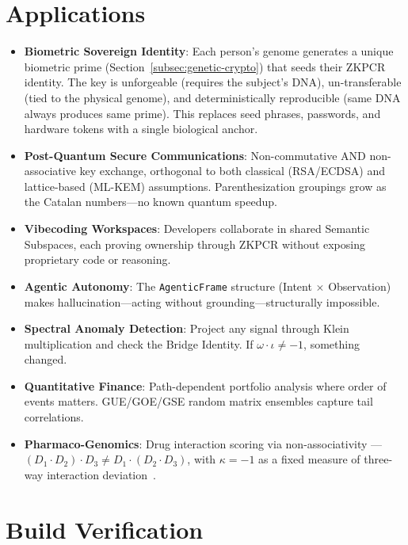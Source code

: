 \documentclass[12pt,a4paper]{article}
\begin{document}
\section{Applications}
\label{sec:applications}

\begin{itemize}[noitemsep]
\item \textbf{Biometric Sovereign Identity}: Each person's genome generates a unique biometric prime (Section~\ref{subsec:genetic-crypto}) that seeds their ZKPCR identity. The key is unforgeable (requires the subject's DNA), un-transferable (tied to the physical genome), and deterministically reproducible (same DNA always produces same prime). This replaces seed phrases, passwords, and hardware tokens with a single biological anchor.
\item \textbf{Post-Quantum Secure Communications}: Non-commutative AND non-associative key exchange, orthogonal to both classical (RSA/ECDSA) and lattice-based (ML-KEM) assumptions. Parenthesization groupings grow as the Catalan numbers---no known quantum speedup.
\item \textbf{Vibecoding Workspaces}: Developers collaborate in shared Semantic Subspaces, each proving ownership through ZKPCR without exposing proprietary code or reasoning.
\item \textbf{Agentic Autonomy}: The \texttt{AgenticFrame} structure (Intent $\times$ Observation) makes hallucination---acting without grounding---structurally impossible.
\item \textbf{Spectral Anomaly Detection}: Project any signal through Klein multiplication and check the Bridge Identity. If $\omega \cdot \iota \neq -1$, something changed.
\item \textbf{Quantitative Finance}: Path-dependent portfolio analysis where order of events matters. GUE/GOE/GSE random matrix ensembles capture tail correlations.
\item \textbf{Pharmaco-Genomics}: Drug interaction scoring via non-associativity --- $(D_1 \cdot D_2) \cdot D_3 \neq D_1 \cdot (D_2 \cdot D_3)$, with $\kappa = -1$ as a fixed measure of three-way interaction deviation~\cite{PP-II-Ch13}.
\end{itemize}

\section{Build Verification}
\label{sec:verification}
\end{document}
